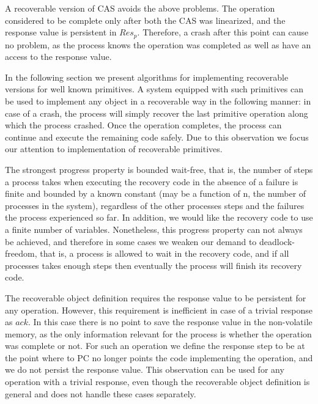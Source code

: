 A recoverable version of CAS avoids the above problems. The operation considered to be complete only after both the CAS was linearized, and the response value is persistent in $Res_p$. Therefore, a crash after this point can cause no problem, as the process knows the operation was completed as well as have an access to the response value.

In the following section we present algorithms for implementing recoverable versions for well known primitives. A system equipped with such primitives can be used to implement any object in a recoverable way in the following manner: in case of a crash, the process will simply recover the last primitive operation along which the process crashed. Once the operation completes, the process can continue and execute the remaining code safely. Due to this observation we focus our attention to implementation of recoverable primitives.

The strongest progress property is bounded wait-free, that is, the number of steps a process takes when executing the recovery code in the absence of a failure is finite and bounded by a known constant (may be a function of n, the number of processes in the system), regardless of the other processes steps and the failures the process experienced so far. In addition, we would like the recovery code to use a finite number of variables.
Nonetheless, this progress property can not always be achieved, and therefore in some cases we weaken our demand to deadlock-freedom, that is, a process is allowed to wait in the recovery code, and if all processes takes enough steps then eventually the process will finish its recovery code.

The recoverable object definition requires the response value to be persistent for any operation. However, this requirement is inefficient in case of a trivial response as $ack$. In this case there is no point to save the response value in the non-volatile memory, as the only information relevant for the process is whether the operation was complete or not. For such an operation we define the response step to be at the point where to PC no longer points the code implementing the operation, and we do not persist the response value. This observation can be used for any operation with a trivial response, even though the recoverable object definition is general and does not handle these cases separately.

